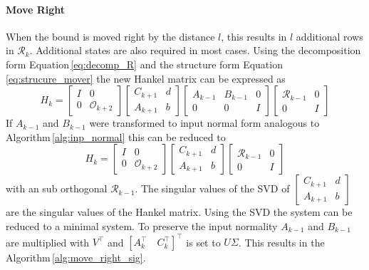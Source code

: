 \documentclass[doctype=mastersthesis,BCOR=15mm,biblatex]{ldvbook}%
\newcommand{\R}{\mathcal{R}} %
\newcommand{\Ob}{\mathcal{O}} %
\newcommand{\eye}{I} %
\begin{document}
\paragraph{Move Right}
When the bound is moved right by the distance $l$, this results in $l$ additional rows in $\R_k$.
Additional states are also required in most cases.
Using the decomposition form Equation\,\ref{eq:decomp_R} and the structure form Equation\,\ref{eq:strucure_mover} the new Hankel matrix can be expressed as
\begin{equation}
	H_k = 
	\begin{bmatrix}
	\eye & 0\\ 0 &\Ob_{k+2}
	\end{bmatrix}
	\begin{bmatrix}
	C_{k+1} & d\\
	A_{k+1} & b
	\end{bmatrix}
	\begin{bmatrix}
	A_{k-1}&B_{k-1}&0\\
	0&0&\eye
	\end{bmatrix}
	\begin{bmatrix}
	\R_{k-1} & 0\\ 0& \eye
	\end{bmatrix}
\end{equation}
If $A_{k-1}$ and $B_{k-1}$ were transformed to input normal form analogous to Algorithm\,\ref{alg:inp_normal} this can be reduced to 
\begin{equation}
H_k = 
\begin{bmatrix}
\eye & 0\\ 0 &\Ob_{k+2}
\end{bmatrix}
\begin{bmatrix}
C_{k+1} & d\\
A_{k+1} & b
\end{bmatrix}
\begin{bmatrix}
\R_{k-1} & 0\\ 0& \eye
\end{bmatrix}
\end{equation}
with an sub orthogonal $\R_{k-1}$.
The singular values of the SVD of $\begin{bmatrix}
	C_{k+1} & d\\
	A_{k+1} & b
\end{bmatrix}$ are the singular values of the Hankel matrix.
Using the SVD the system can be reduced to a minimal system. 
To preserve the input normality $A_{k-1}$ and $B_{k-1}$ are multiplied with $V^\top$ and $[A_k^\top \quad C_k^\top]^\top$ is set to $U \Sigma$.
This results in the Algorithm\,\ref{alg:move_right_sig}.
\end{document}
